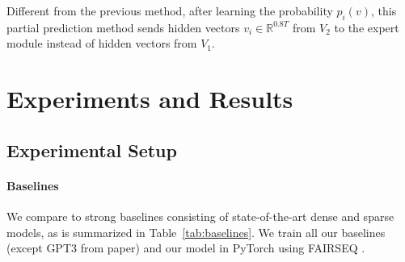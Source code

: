 \documentclass{article}
\begin{document}
Different from the previous method, after learning the probability $p_i(v)$, this partial prediction method sends hidden vectors $v_i \in \mathbb{R}^{0.8T}$ from $V_2$ to the expert module instead of hidden vectors from $V_1$.





 \section{Experiments and Results}

\subsection{Experimental Setup}
\label{sec:expe_setup}





\paragraph{Baselines} 


We compare to strong baselines consisting of state-of-the-art dense and sparse models, as is summarized in Table~\ref{tab:baselines}. We train all our baselines (except GPT3 from paper) and our model in PyTorch \citep{pytorch} using FAIRSEQ \citep{fairseq}.


\begin{table}
\centering
{}
    \caption{\textbf{Baselines}: we compare our sMLP with  dense Transformers and MLPs as well as sparse Transformer-based MoEs.}\label{tab:baselines}
\end{table}
\end{document}

